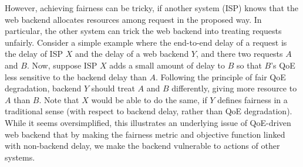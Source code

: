 

However, achieving fairness can be tricky, if another system (\eg ISP) knows that the web backend allocates resources among request in the proposed way. In particular, the other system can trick the web backend into treating requests unfairly.
Consider a simple example where the end-to-end delay of a request is the delay of ISP $X$ and the delay of a web backend $Y$, and there  two requests $A$ and $B$.
Now, suppose ISP $X$ adds a small amount of delay to $B$ so that $B$'s QoE less sensitive to the backend delay than $A$. Following the principle of fair QoE degradation, backend $Y$ should treat $A$ and $B$ differently, giving more resource to $A$ than $B$. 
Note that $X$ would be able to do the same, if $Y$ defines fairness in a traditional sense (\ie with respect to backend delay, rather than QoE degradation).
While it seems oversimplified, this illustrates an underlying issue of QoE-driven web backend that by making the fairness metric and objective function linked with non-backend delay, we make the backend vulnerable to actions of other systems.


